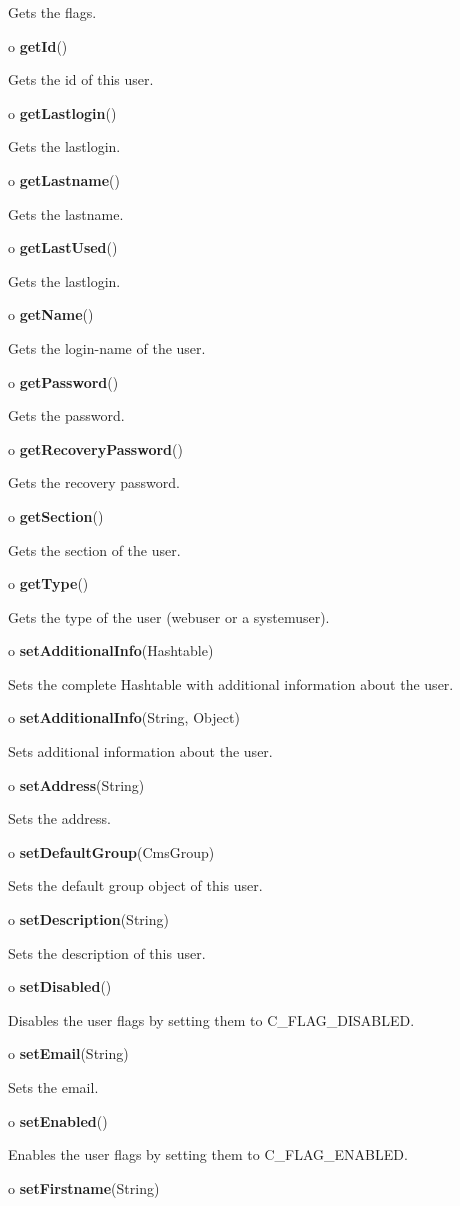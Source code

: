 \begin{description}
Gets the flags.  
\item o {\bf getId}()  

Gets the id of this user.  
\item o {\bf getLastlogin}()  

Gets the lastlogin.  
\item o {\bf getLastname}()  

Gets the lastname.  
\item o {\bf getLastUsed}()  

Gets the lastlogin.  
\item o {\bf getName}()  

Gets the login-name of the user.  
\item o {\bf getPassword}()  

Gets the password.  
\item o {\bf getRecoveryPassword}()  

Gets the recovery password.  
\item o {\bf getSection}()  

Gets the section of the user.  
\item o {\bf getType}()  

Gets the type of the user (webuser or a systemuser).  
\item o {\bf setAdditionalInfo}(Hashtable)  

Sets the complete Hashtable with additional information about the user.  
\item o {\bf setAdditionalInfo}(String, Object)  

Sets additional information about the user.  
\item o {\bf setAddress}(String)  

Sets the address.  
\item o {\bf setDefaultGroup}(CmsGroup)  

Sets the default group object of this user.  
\item o {\bf setDescription}(String)  

Sets the description of this user.  
\item o {\bf setDisabled}()  

Disables the user flags by setting them to C\_FLAG\_DISABLED.  
\item o {\bf setEmail}(String)  

Sets the email.  
\item o {\bf setEnabled}()  

Enables the user flags by setting them to C\_FLAG\_ENABLED.  
\item o {\bf setFirstname}(String)  


\end{description}

